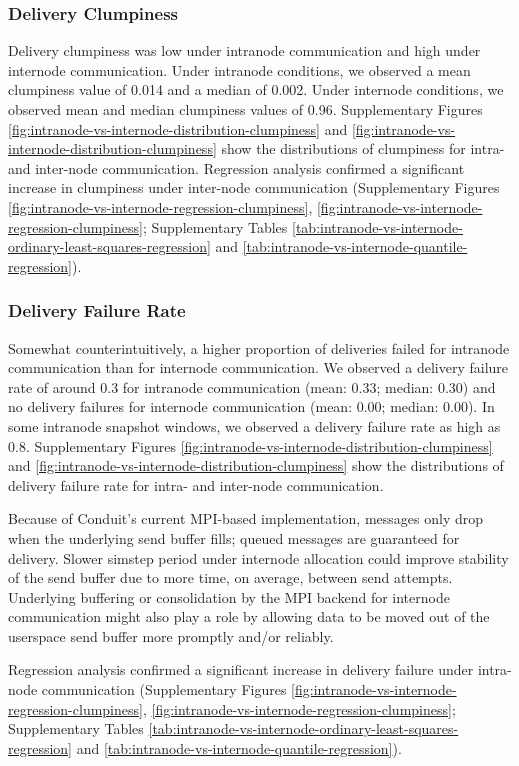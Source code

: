 \subsubsection{Delivery Clumpiness}

Delivery clumpiness was low under intranode communication and high under internode communication.
Under intranode conditions, we observed a mean clumpiness value of 0.014 and a median of 0.002.
Under internode conditions, we observed mean and median clumpiness values of 0.96.
Supplementary Figures \ref{fig:intranode-vs-internode-distribution-clumpiness} and \ref{fig:intranode-vs-internode-distribution-clumpiness} show the distributions of clumpiness for intra- and inter-node communication.
Regression analysis confirmed a significant increase in clumpiness under inter-node communication (Supplementary Figures \ref{fig:intranode-vs-internode-regression-clumpiness}, \ref{fig:intranode-vs-internode-regression-clumpiness}; Supplementary Tables \ref{tab:intranode-vs-internode-ordinary-least-squares-regression} and \ref{tab:intranode-vs-internode-quantile-regression}).

\subsubsection{Delivery Failure Rate}

Somewhat counterintuitively, a higher proportion of deliveries failed for intranode communication than for internode communication.
We observed a delivery failure rate of around 0.3 for intranode communication (mean: 0.33; median: 0.30) and no delivery failures for internode communication (mean: 0.00; median: 0.00).
In some intranode snapshot windows, we observed a delivery failure rate as high as 0.8.
Supplementary Figures \ref{fig:intranode-vs-internode-distribution-clumpiness} and \ref{fig:intranode-vs-internode-distribution-clumpiness} show the distributions of delivery failure rate for intra- and inter-node communication.

Because of Conduit's current MPI-based implementation, messages only drop when the underlying send buffer fills; queued messages are guaranteed for delivery.
Slower simstep period under internode allocation could improve stability of the send buffer due to more time, on average, between send attempts.
Underlying buffering or consolidation by the MPI backend for internode communication might also play a role by allowing data to be moved out of the userspace send buffer more promptly and/or reliably.

Regression analysis confirmed a significant increase in delivery failure under intra-node communication (Supplementary Figures \ref{fig:intranode-vs-internode-regression-clumpiness}, \ref{fig:intranode-vs-internode-regression-clumpiness}; Supplementary Tables \ref{tab:intranode-vs-internode-ordinary-least-squares-regression} and \ref{tab:intranode-vs-internode-quantile-regression}).
